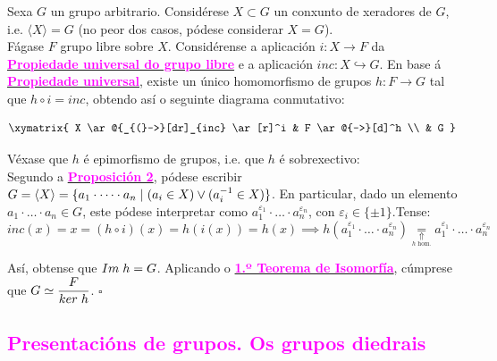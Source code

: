 \documentclass[twoside]{report}
\newcommand{\magbf}[1]{\textcolor{magenta}{\textbf{#1}}} %
\theoremstyle{mystyle}
\begin{document}
\vspace{2mm}

\noindent Sexa $G$ un grupo arbitrario. Considérese $X \subset G$ un conxunto de xeradores de $G$, i.e. $\langle X \rangle = G$ (no peor dos casos, pódese considerar $X = G$).\\

\noindent Fágase $F$ grupo libre sobre $X$. Considérense a aplicación $i: X \longrightarrow F$ da \hyperref[th1.11]{\magbf{Propiedade universal do grupo libre}} e a aplicación $inc: X \hookrightarrow G$. En base á \hyperref[th1.11]{\magbf{Propiedade universal}}, existe un único homomorfismo de grupos $h: F \longrightarrow G$ tal que $h \circ i = inc$, obtendo así o seguinte diagrama conmutativo:

$$
     \large \xymatrix{
        X \ar@{_{(}->}[dr]_{inc} \ar[r]^i & F \ar@{-->}[d]^h \\
        & G
    }    
$$

\noindent Véxase que $h$ é epimorfismo de grupos, i.e. que $h$ é sobrexectivo:\\

\noindent Segundo a \hyperref[prop1.2]{\magbf{Proposición 2}}, pódese escribir $G = \langle X \rangle = \{a_{1} \cdot \dots \cdot a_{n} \hspace{1mm} | \hspace{1mm} (a_{i} \in X)\lor(a_{i}^{-1} \in X)\}$. En particular, dado un elemento $a_{1} \cdot \dots \cdot a_{n} \in G$, este pódese interpretar como $a_{1}^{\varepsilon_{1}} \cdot \dots \cdot a_{n}^{\varepsilon_{n}}$, con $\varepsilon_{i} \in \{\pm1\}$.Tense: 
$$inc(x) = x = (h \circ i)(x) = h(i(x)) = h(x) \implies h(a_{1}^{\varepsilon_{1}} \cdot \dots \cdot a_{n}^{\varepsilon_{n}}) \underset{\underset{\text{$h$ hom.}}{\Uparrow}}{=} a_{1}^{\varepsilon_{1}} \cdot \dots \cdot a_{n}^{\varepsilon_{n}}$$

\noindent Así, obtense que $Im \hspace{1mm} h = G$. Aplicando o \hyperref[th1.5]{\magbf{1.º Teorema de Isomorfía}}, cúmprese que $G \simeq \displaystyle \frac{F}{ker \hspace{1mm} h}$. $\square$

\textcolor{magenta}{\subsection{Presentacións de grupos. Os grupos diedrais}}

\vspace{5mm}
\end{document}
